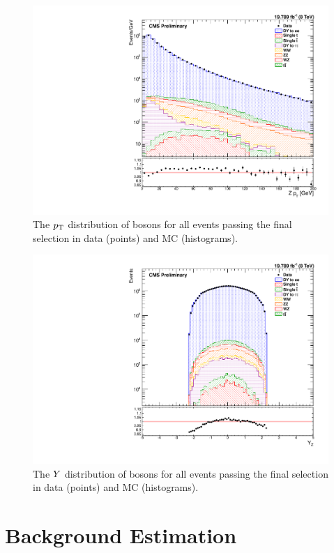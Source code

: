 \begin{figure}[!htbp]
    \centering
    \includegraphics[width=\textwidth]{figures/z_pt.pdf}
    \caption{
        The $p_{\mathrm{T}}$ distribution of \Z bosons for all events passing the final
        selection in data (points) and MC (histograms).
    }
    \label{fig:z_pt}
\end{figure}

\begin{figure}[!htbp]
    \centering
    \includegraphics[width=\textwidth]{figures/z_rapidity.pdf}
    \caption{
        The $Y$ distribution of \Z bosons for all events passing the
        final selection in data (points) and MC (histograms).
    }
    \label{fig:z_rapidity}
\end{figure}

\section{Background Estimation}

